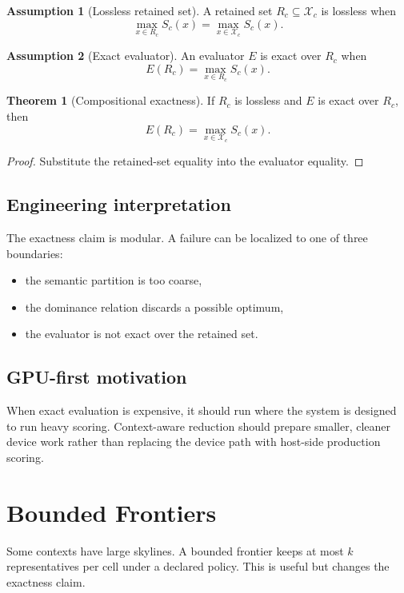 \documentclass[11pt,oneside]{article}
\theoremstyle{definition}
\newtheorem{assumption}{Assumption}[section]
\newtheorem{theorem}{Theorem}[section]
\newcommand{\cand}{\mathcal{X}}
\newcommand{\score}{S}
\begin{document}
\begin{assumption}[Lossless retained set]
A retained set \(R_c\subseteq\cand_c\) is lossless when
\[
  \max_{x\in R_c}\score_c(x)
  =
  \max_{x\in\cand_c}\score_c(x).
\]
\end{assumption}

\begin{assumption}[Exact evaluator]
An evaluator \(E\) is exact over \(R_c\) when
\[
  E(R_c)=\max_{x\in R_c}\score_c(x).
\]
\end{assumption}

\begin{theorem}[Compositional exactness]
If \(R_c\) is lossless and \(E\) is exact over \(R_c\), then
\[
  E(R_c)=\max_{x\in\cand_c}\score_c(x).
\]
\end{theorem}

\begin{proof}
Substitute the retained-set equality into the evaluator equality.
\end{proof}

\subsection{Engineering interpretation}
The exactness claim is modular. A failure can be localized to one of three boundaries:
\begin{itemize}
  \item the semantic partition is too coarse,
  \item the dominance relation discards a possible optimum,
  \item the evaluator is not exact over the retained set.
\end{itemize}

\subsection{GPU-first motivation}
When exact evaluation is expensive, it should run where the system is designed to run heavy scoring. Context-aware reduction should prepare smaller, cleaner device work rather than replacing the device path with host-side production scoring.

\section{Bounded Frontiers}

Some contexts have large skylines. A bounded frontier keeps at most \(k\) representatives per cell under a declared policy. This is useful but changes the exactness claim.
\end{document}
